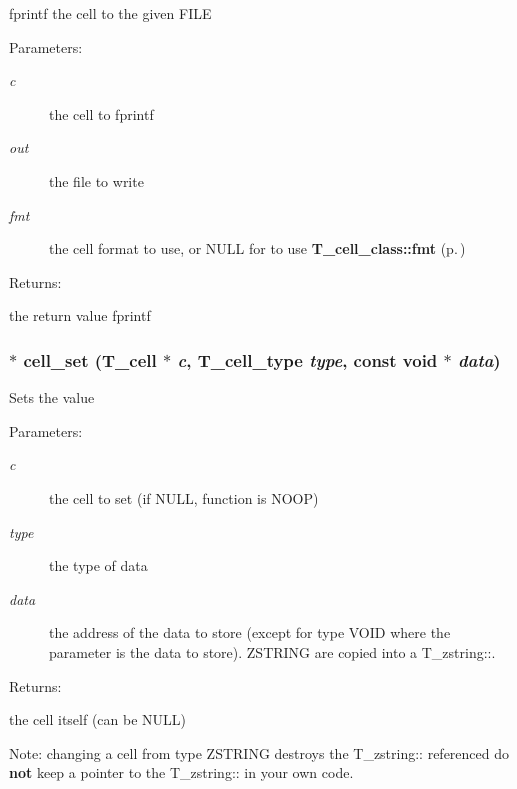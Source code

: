 fprintf the cell to the given FILE\begin{Desc}
\item[Parameters: ]\par
\begin{description}
\item[{\em 
c}]the cell to fprintf \item[{\em 
out}]the file to write \item[{\em 
fmt}]the cell format to use, or NULL for to use {\bf T\_\-cell\_\-class::fmt} {\rm (p.\,\pageref{structS__cell__class_m0})} \end{description}
\end{Desc}
\begin{Desc}
\item[Returns: ]\par
the return value fprintf \end{Desc}
\subsubsection{$\ast$ cell\_\-set ({\bf T\_\-cell} $\ast$ {\em c}, {\bf T\_\-cell\_\-type} {\em type}, const void $\ast$ {\em data})}\label{table_8h_a24}


Sets the value\begin{Desc}
\item[Parameters: ]\par
\begin{description}
\item[{\em 
c}]the cell to set (if NULL, function is NOOP) \item[{\em 
type}]the type of data \item[{\em 
data}]the address of the data to store (except for type VOID where the parameter is the data to store). ZSTRING are copied into a T\_\-zstring::. \end{description}
\end{Desc}
\begin{Desc}
\item[Returns: ]\par
the cell itself (can be NULL)\end{Desc}
Note: changing a cell from type ZSTRING destroys the T\_\-zstring:: referenced do {\bf not} keep a pointer to the T\_\-zstring:: in your own code. 
